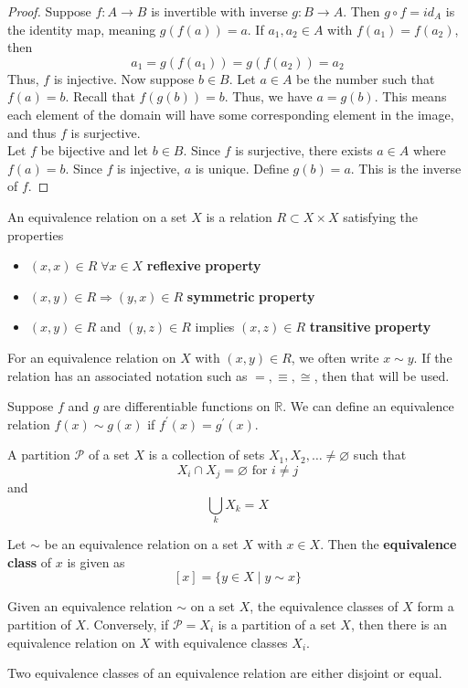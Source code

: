 \documentclass[12pt, letterpaper]{report}
\begin{document}
\begin{proof}
	Suppose \(f:A\to B\) is invertible with inverse \(g:B\to A\). Then \(g\circ f=id_A\) is the identity map, meaning \(g(f(a))=a\). If \(a_1,a_2\in A\) with \(f(a_1)=f(a_2)\), then
	\[
		a_1=g(f(a_1))=g(f(a_2))=a_2
	\]
	Thus, \(f\) is injective. Now suppose \(b\in B\). Let \(a\in A\) be the number such that \(f(a)=b\). Recall that \(f(g(b))=b\). Thus, we have \(a=g(b)\). This means each element of the domain will have some corresponding element in the image, and thus \(f\) is surjective.\\
	Let \(f\) be bijective and let \(b\in B\). Since \(f\) is surjective, there exists \(a\in A\) where \(f(a)=b\). Since \(f\) is injective, \(a\) is unique. Define \(g(b)=a\). This is the inverse of \(f\).
\end{proof}
\begin{definition}
	An equivalence relation on a set \(X\) is a relation \(R\subset X\times X\) satisfying the properties
	\begin{itemize}
		\item \((x,x)\in R\;\forall x\in X\) \textbf{reflexive} \textbf{property} 
		\item \((x,y)\in R\Longrightarrow (y,x)\in R\) \textbf{symmetric} \textbf{property} 
		\item \((x,y)\in R\) and \((y,z)\in R\) implies \((x,z)\in R\) \textbf{transitive} \textbf{property}
	\end{itemize}
\end{definition}
For an equivalence relation on \(X\) with \((x,y)\in R\), we often write \(x \sim y\). If the relation has an associated notation such as \(=,\equiv ,\cong \), then that will be used.
\begin{eg}
	Suppose \(f\) and \(g\) are differentiable functions on \(\mathbb{R} \). We can define an equivalence relation \(f(x)\sim g(x)\) if \(f^{\prime} (x)=g^{\prime} (x)\).
\end{eg}
\begin{definition}[Partition]
	A partition \(\mathcal{P} \) of a set \(X\) is a collection of sets \(X_1,X_2,\ldots\neq \varnothing \) such that
	\[X_{i} \cap X_j = \varnothing \text{ for }i\neq j\]
	and
	\[\bigcup_{k}X_k=X\]
\end{definition}
\begin{definition}
	Let \(\sim \) be an equivalence relation on a set \(X\) with \(x\in X\). Then the \textbf{equivalence} \textbf{class} of \(x\) is given as 
	\[
		[x]=\{ y\in X\mid y\sim x \} 
	\]
\end{definition}
\begin{theorem}
	Given an equivalence relation \(\sim \) on a set \(X\), the equivalence classes of \(X\) form a partition of \(X\). Conversely, if \(\mathcal{P} ={X_i}\) is a partition of a set \(X\), then there is an equivalence relation on \(X\) with equivalence classes \(X_i\).
\end{theorem}
\begin{corollary}
	Two equivalence classes of an equivalence relation are either disjoint or equal.
\end{corollary}
\end{document}

